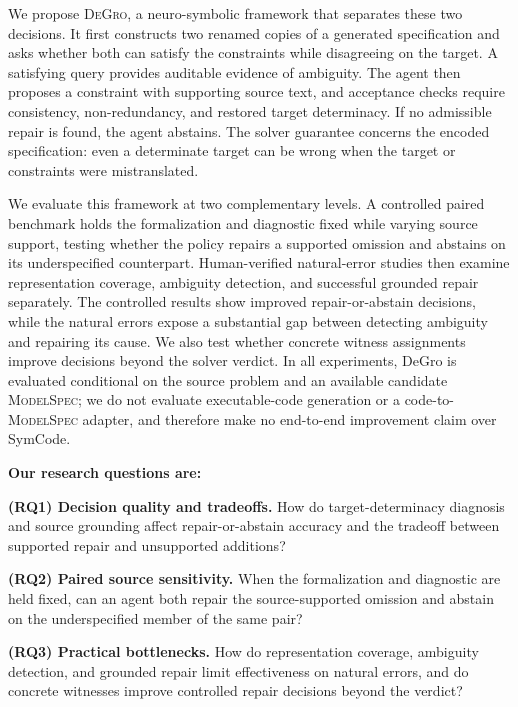 \documentclass[sigconf,anonymous]{aamas}
\newcommand{\method}{\textsc{DeGro}}
\begin{document}
We propose \method{}, a neuro-symbolic framework that separates these two decisions.  It first constructs two renamed copies of a generated specification and asks whether both can satisfy the constraints while disagreeing on the target.  A satisfying query provides auditable evidence of ambiguity.  The agent then proposes a constraint with supporting source text, and acceptance checks require consistency, non-redundancy, and restored target determinacy.  If no admissible repair is found, the agent abstains.  The solver guarantee concerns the encoded specification: even a determinate target can be wrong when the target or constraints were mistranslated.

We evaluate this framework at two complementary levels.  A controlled paired benchmark holds the formalization and diagnostic fixed while varying source support, testing whether the policy repairs a supported omission and abstains on its underspecified counterpart.  Human-verified natural-error studies then examine representation coverage, ambiguity detection, and successful grounded repair separately.  The controlled results show improved repair-or-abstain decisions, while the natural errors expose a substantial gap between detecting ambiguity and repairing its cause.  We also test whether concrete witness assignments improve decisions beyond the solver verdict.  In all experiments, DeGro is evaluated conditional on the source problem and an available candidate \textsc{ModelSpec}; we do not evaluate executable-code generation or a code-to-\textsc{ModelSpec} adapter, and therefore make no end-to-end improvement claim over SymCode.

\par\addvspace{9pt}
\begingroup
\setlength{\parskip}{5pt}
\noindent\textbf{Our research questions are:}

\noindent\textbf{(RQ1) Decision quality and tradeoffs.} How do target-determinacy diagnosis and source grounding affect repair-or-abstain accuracy and the tradeoff between supported repair and unsupported additions?

\noindent\textbf{(RQ2) Paired source sensitivity.} When the formalization and diagnostic are held fixed, can an agent both repair the source-supported omission and abstain on the underspecified member of the same pair?

\noindent\textbf{(RQ3) Practical bottlenecks.} How do representation coverage, ambiguity detection, and grounded repair limit effectiveness on natural errors, and do concrete witnesses improve controlled repair decisions beyond the verdict?
\par
\endgroup
\par\addvspace{10pt}
\end{document}
